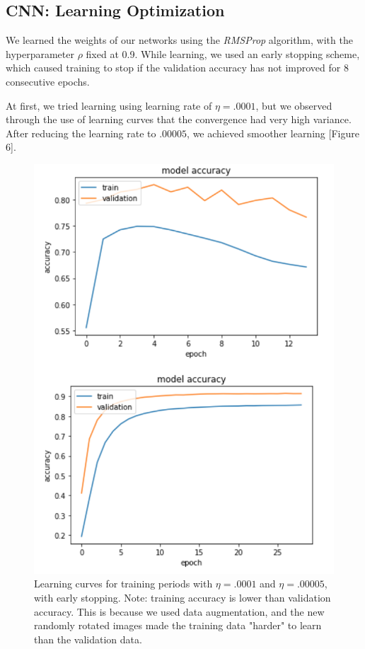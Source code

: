 \documentclass[letterpaper, 10 pt, conference]{ieeeconf}  %
\begin{document}
\subsection{CNN: Learning Optimization} 

We learned the weights of our networks using the \emph{RMSProp} algorithm, with the hyperparameter $\rho$ fixed at 0.9. While learning, we used an early stopping scheme, which caused training to stop if the validation accuracy has not improved for 8 consecutive epochs. 

At first, we tried learning using learning rate of $\eta = .0001$, but we observed through the use of learning curves that the convergence had very high variance. After reducing the learning rate to $.00005$, we achieved smoother learning [Figure 6].

\begin{figure}
      \centering
      \includegraphics[scale = .6]{learning_curves.png}
		\centering
      \caption{Learning curves for training periods with $\eta = .0001$ and $\eta = .00005$, with early stopping. Note: training accuracy is lower than validation accuracy. This is because we used data augmentation, and the new randomly rotated images made the training data "harder" to learn than the validation data.}
      \label{figurelabel}
\end{figure}
\end{document}
